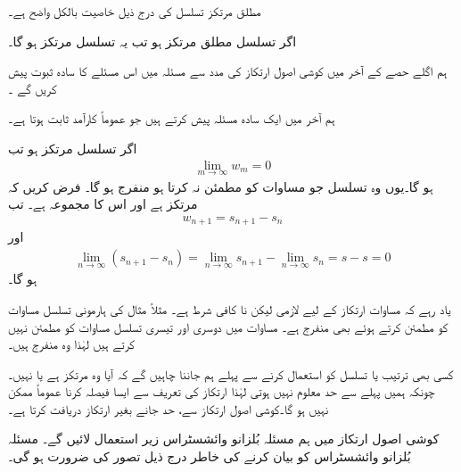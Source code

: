 مطلق مرتکز تسلسل کی درج ذیل خاصیت بالکل واضح ہے۔

اگر تسلسل  مطلق مرتکز ہو تب یہ تسلسل مرتکز ہو گا۔

ہم اگلے حصے کے  آخر میں کوشی اصول ارتکاز کی مدد سے مسئلہ  میں   اس مسئلے کا سادہ ثبوت پیش کریں گے ۔

ہم آخر میں ایک سادہ مسئلہ پیش کرتے ہیں جو عموماً کارآمد ثابت ہوتا ہے۔

اگر تسلسل  مرتکز ہو تب
\begin{align}\label{مساوات_ترتیب_مرکوزیت_شرط}
\lim_{m\to\infty} w_m=0
\end{align}
ہو گا۔یوں وہ تسلسل جو مساوات  کو مطمئن نہ کرتا ہو منفرج ہو گا۔
\quad
فرض کریں کہ  مرتکز ہے اور اس کا مجموعہ  ہے۔ تب 
\begin{align*}
w_{n+1}=s_{n+1}-s_n
\end{align*}
اور
\begin{align*}
\lim_{n\to\infty} (s_{n+1}-s_n)=\lim_{n\to\infty}s_{n+1} -\lim_{n\to\infty}s_n=s-s=0
\end{align*}
ہو گا۔

یاد رہے کہ مساوات  ارتکاز کے لیے لازمی لیکن نا کافی شرط ہے۔ مثلاً مثال  کی ہارمونی تسلسل مساوات  کو مطمئن کرتے ہوئے بھی  منفرج ہے۔  مساوات  میں دوسری اور تیسری تسلسل مساوات   کو مطمئن نہیں کرتے ہیں لہٰذا وہ منفرج ہیں۔

کسی بھی ترتیب یا تسلسل کو استعمال کرنے سے پہلے ہم جاننا چاہیں گے کہ آیا وہ مرتکز ہے یا نہیں۔چونکہ ہمیں پہلے سے حد معلوم نہیں ہوتی  لہٰذا ارتکاز کی تعریف سے ایسا فیصلہ کرنا عموماً ممکن نہیں ہو گا۔کوشی اصول ارتکاز سے، حد جانے بغیر ارتکاز دریافت کرتا ہے۔

کوشی اصول ارتکاز میں ہم  مسئلہ بُلزانو وائشسٹراس زیر استعمال لائیں گے۔ مسئلہ بُلزانو وائشسٹراس کو بیان کرنے کی خاطر درج ذیل تصور کی ضرورت ہو گی۔  

